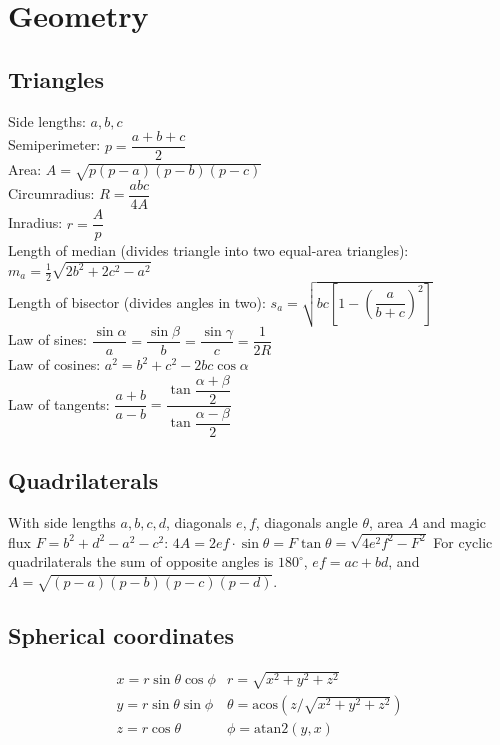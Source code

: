 \section{Geometry}

\subsection{Triangles}
Side lengths: $a,b,c$\\
Semiperimeter: $p=\dfrac{a+b+c}{2}$\\
Area: $A=\sqrt{p(p-a)(p-b)(p-c)}$\\
Circumradius: $R=\dfrac{abc}{4A}$\\
Inradius: $r=\dfrac{A}{p}$\\
Length of median (divides triangle into two equal-area triangles): $m_a=\tfrac{1}{2}\sqrt{2b^2+2c^2-a^2}$\\
Length of bisector (divides angles in two): $s_a=\sqrt{bc\left[1-\left(\dfrac{a}{b+c}\right)^2\right]}$\\
Law of sines: $\dfrac{\sin\alpha}{a}=\dfrac{\sin\beta}{b}=\dfrac{\sin\gamma}{c}=\dfrac{1}{2R}$\\
Law of cosines: $a^2=b^2+c^2-2bc\cos\alpha$\\
Law of tangents: $\dfrac{a+b}{a-b}=\dfrac{\tan\dfrac{\alpha+\beta}{2}}{\tan\dfrac{\alpha-\beta}{2}}$\\

\subsection{Quadrilaterals}
With side lengths $a,b,c,d$, diagonals $e, f$, diagonals angle $\theta$, area $A$ and
magic flux $F=b^2+d^2-a^2-c^2$:
$4A = 2ef \cdot \sin\theta = F\tan\theta = \sqrt{4e^2f^2-F^2}$
 For cyclic quadrilaterals the sum of opposite angles is $180^\circ$,
$ef = ac + bd$, and $A = \sqrt{(p-a)(p-b)(p-c)(p-d)}$.


\subsection{Spherical coordinates}
\[\begin{array}{cc}
x = r\sin\theta\cos\phi & r = \sqrt{x^2+y^2+z^2}\\
y = r\sin\theta\sin\phi & \theta = \textrm{acos}(z/\sqrt{x^2+y^2+z^2})\\
z = r\cos\theta & \phi = \textrm{atan2}(y,x)
\end{array}\]


